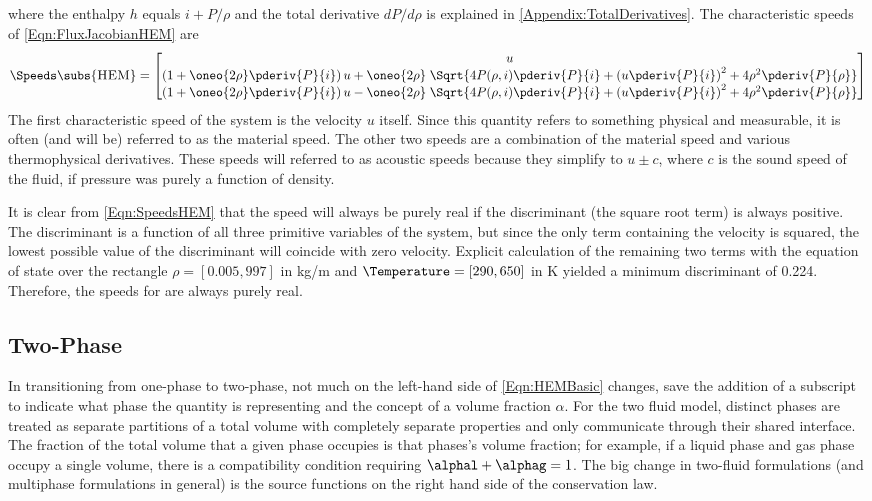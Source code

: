 where the enthalpy $h$ equals $i + P/\rho$ and the total derivative $dP/d\rho$ is explained in \cref{Appendix:TotalDerivatives}.
The characteristic speeds of \cref{Eqn:FluxJacobianHEM} are
\begin{equation}
    \Speeds\subs{\textsc{HEM}} =   \begin{bmatrix}
                    u \\
                    \left(1 + \oneo{2\rho}\pderiv{P}{i}\right)u  + \oneo{2 \rho}\;\Sqrt{4 P(\rho,i) \pderiv{P}{i}+\left(u\pderiv{P}{i}\right)^2 + 4 \rho^2 \pderiv{P}{\rho}} \\
                    \left(1 + \oneo{2\rho}\pderiv{P}{i}\right)u  - \oneo{2 \rho}\;\Sqrt{4 P(\rho,i) \pderiv{P}{i}+\left(u\pderiv{P}{i}\right)^2 + 4 \rho^2 \pderiv{P}{\rho}} \\
                \end{bmatrix}
    \label{Eqn:SpeedsHEM}
\end{equation}
The first characteristic speed of the system is the velocity $u$ itself.
Since this quantity refers to something physical and measurable, it is often (and will be) referred to as the material speed.
The other two speeds are a combination of the material speed and various thermophysical derivatives.
These speeds will referred to as acoustic speeds because they simplify to $u \pm c$, where $c$ is the sound speed of the fluid, if pressure was purely a function of density.

It is clear from \cref{Eqn:SpeedsHEM} that the speed will always be purely real if the discriminant (the square root term) is always positive.
The discriminant is a function of all three primitive variables of the system, but since the only term containing the velocity is squared, the lowest possible value of the discriminant will coincide with zero velocity.
Explicit calculation of the remaining two terms with the equation of state over the rectangle $\rho = [0.005,997]$ in kg/m and $\Temperature = [290,650]$ in K yielded a minimum discriminant of 0.224.
Therefore, the speeds for  are always purely real.


\subsection{Two-Phase}
In transitioning from one-phase to two-phase, not much on the left-hand side of \cref{Eqn:HEMBasic} changes, save the addition of a subscript to indicate what phase the quantity is representing and the concept of a volume fraction $\alpha$.
For the two fluid model, distinct phases are treated as separate partitions of a total volume with completely separate properties and only communicate through their shared interface.
The fraction of the total volume that a given phase occupies is that phases's volume fraction; for example, if a liquid phase and gas phase occupy a single volume, there is a compatibility condition requiring $\alphal + \alphag = 1$.
The big change in two-fluid formulations (and multiphase formulations in general) is the source functions on the right hand side of the conservation law.

